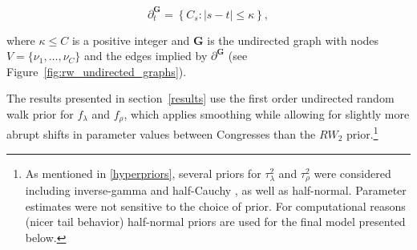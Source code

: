 \begin{equation*}
\partial^\mathbf{G}_t = \left\{C_s : \left| s - t \right| \leq \kappa \right\},
\end{equation*}

\noindent where $\kappa \leq C$ is a positive integer and $\mathbf{G}$ is the undirected graph 
with nodes $V = \{\nu_1, \dots, \nu_C\}$ and the edges implied by $\partial^\mathbf{G}$ 
(see Figure~\ref{fig:rw_undirected_graphs}). 


The results presented in section~\ref{results} use 
the first order undirected random walk prior for $f_\lambda$ and $f_\rho$, which applies smoothing 
while allowing for slightly more abrupt shifts in parameter values between Congresses than the 
$RW_2$ prior.\footnote{As mentioned in \ref{hyperpriors}, several priors for $\tau^2_\lambda$ 
and $\tau^2_\rho$ were considered including inverse-gamma  
and half-Cauchy , as well as half-normal. Parameter estimates were 
not sensitive to the choice of prior. For computational reasons (nicer tail behavior) half-normal priors 
are used for the final model presented below.}


 


